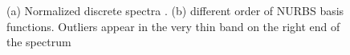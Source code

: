 \begin{figure}
    \centering
    \begin{subfigure}[b]{0.49\linewidth}
        \centering
    \end{subfigure}
    \begin{subfigure}[b]{0.49\linewidth}
        \centering
    \end{subfigure}
    \caption[Normalized discrete spectra]{(a) Normalized discrete spectra \citep{Cot2006}. (b) different order of NURBS basis functions. Outliers appear in the very thin band on the right end of the spectrum}
    \label{intro_fig:Femvsnurbs}
\end{figure}



